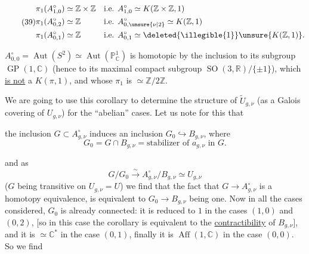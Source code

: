 \[
\tag{39}
\begin{aligned}
\pi_1(A_{1,0}^{\circ})&\simeq\mathbb Z\times\mathbb Z
&&\text{i.e. }A_{1,0}^{\circ}\simeq K(\mathbb Z\times\mathbb Z,1)\\
\pi_1(A_{0,2}^{\circ})&\simeq\mathbb Z
&&\text{i.e. }A_{0,\unsure{\nu|2}}^{\circ}\simeq K(\mathbb Z,1)\\
\pi_1(A_{0,1}^{\circ})&\simeq\mathbb Z
&&\text{i.e. }A_{0,1}^{\circ}\simeq\deleted{\illegible{1}}\unsure{K(\mathbb Z,1)}.
\end{aligned}
\]

$A_{0,0}^{\circ}=\operatorname{Aut}(S^2)\simeq\operatorname{Aut}(\mathbb P_{\mathbb C}^1)$ is homotopic by the inclusion to its subgroup $\operatorname{GP}(1,\mathbb C)$ (hence to its maximal compact subgroup $\operatorname{SO}(3,\mathbb R)/\{\pm1\}$), which \uline{is not} a $K(\pi,1)$, and whose $\pi_1$ is $\simeq\mathbb Z/2\mathbb Z$.

We are going to use this corollary to determine the structure of $\widetilde U_{g,\nu}$ (as a Galois covering of $U_{g,\nu}$) for the ``abelian'' cases. Let us note for this that


the inclusion $G\subset A_{g,\nu}^{\circ}$ induces an inclusion $G_0\hookrightarrow B_{g,\nu}$, where 
\[
\tag{40}
G_0=G\cap B_{g,\nu}=\text{stabilizer of }a_{g,\nu}\text{ in }G.
\]

and as
\[
G/G_0\xrightarrow{\sim}A_{g,\nu}^{\circ}/B_{g,\nu}\simeq U_{g,\nu}
\]
($G$ being transitive on $U_{g,\nu}=U$) we find that the fact that $G\longrightarrow A_{g,\nu}^{\circ}$ is a homotopy equivalence, is equivalent to $G_0\longrightarrow B_{g,\nu}$ being one. Now in all the cases considered, $G_0$ is already connected: it is reduced to $1$ in the cases $(1,0)$ and $(0,2)$, [so in this case the corollary is equivalent to the \uline{contractibility} of $B_{g,\nu}$], and it is $\simeq\mathbb C^*$ in the case $(0,1)$, finally it is $\operatorname{Aff}(1,\mathbb C)$ in the case $(0,0)$. So we find

